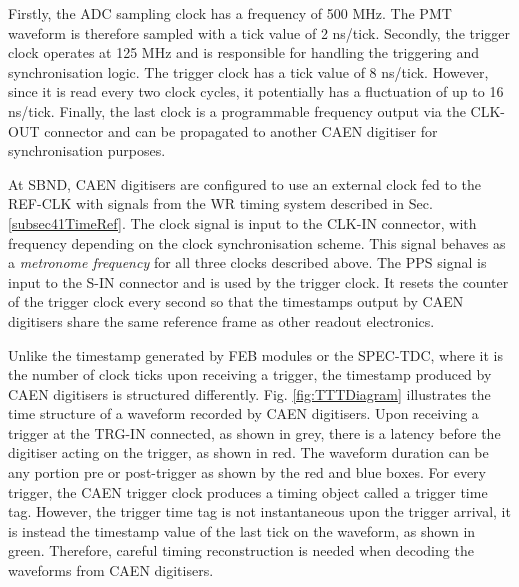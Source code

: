 Firstly, the ADC sampling clock has a frequency of 500 MHz.
The PMT waveform is therefore sampled with a tick value of 2 ns/tick. 
Secondly, the trigger clock operates at 125 MHz and is responsible for handling the triggering and synchronisation logic.
The trigger clock has a tick value of 8 ns/tick.
However, since it is read every two clock cycles, it potentially has a fluctuation of up to 16 ns/tick.
Finally, the last clock is a programmable frequency output via the CLK-OUT connector and can be propagated to another CAEN digitiser for synchronisation purposes.

At SBND, CAEN digitisers are configured to use an external clock fed to the REF-CLK with signals from the WR timing system described in Sec. \ref{subsec41TimeRef}.
The clock signal is input to the CLK-IN connector, with frequency depending on the clock synchronisation scheme.
This signal behaves as a \textit{metronome frequency} for all three clocks described above.
The PPS signal is input to the S-IN connector and is used by the trigger clock.
It resets the counter of the trigger clock every second so that the timestamps output by CAEN digitisers share the same reference frame as other readout electronics.


Unlike the timestamp generated by FEB modules or the SPEC-TDC, where it is the number of clock ticks upon receiving a trigger, the timestamp produced by CAEN digitisers is structured differently.
Fig. \ref{fig:TTTDiagram} illustrates the time structure of a waveform recorded by CAEN digitisers.
Upon receiving a trigger at the TRG-IN connected, as shown in grey, there is a latency before the digitiser acting on the trigger, as shown in red.
The waveform duration can be any portion pre or post-trigger as shown by the red and blue boxes.
For every trigger, the CAEN trigger clock produces a timing object called a trigger time tag.
However, the trigger time tag is not instantaneous upon the trigger arrival, it is instead the timestamp value of the last tick on the waveform, as shown in green.
Therefore, careful timing reconstruction is needed when decoding the waveforms from CAEN digitisers.


